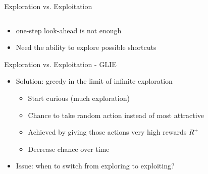 \begin{frame}[c]{Exploration vs. Exploitation}
\begin{columns}[c]
\begin{center}
		\end{center}
	\end{columns}
\begin{itemize}
	\item one-step look-ahead is not enough
	\item Need the ability to explore possible shortcuts
\end{itemize}
\end{frame}

\begin{frame}[c]{Exploration vs. Exploitation - GLIE}
	\begin{itemize}
		\item Solution: greedy in the limit of infinite exploration
		\begin{itemize}
			\item Start curious (much exploration)
			\item Chance to take random action instead of most attractive
			\item Achieved by giving those actions very high rewards $R^{+}$
			\item Decrease chance over time
		\end{itemize}
		\item Issue: when to switch from exploring to exploiting?
	\end{itemize}
	
\end{frame}

